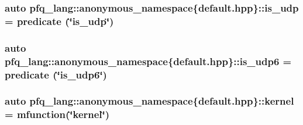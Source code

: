 \hypertarget{namespacepfq__lang_1_1anonymous__namespace_02default_8hpp_03_a120b37089690955fc25203beb98f0fe7}{
\subsubsection[{is\+\_\+udp}]{\setlength{\rightskip}{0pt plus 5cm}auto pfq\+\_\+lang\+::anonymous\+\_\+namespace\{default.\+hpp\}\+::is\+\_\+udp = {\bf predicate} (\char`\"{}is\+\_\+udp\char`\"{})}}\label{namespacepfq__lang_1_1anonymous__namespace_02default_8hpp_03_a120b37089690955fc25203beb98f0fe7}
\hypertarget{namespacepfq__lang_1_1anonymous__namespace_02default_8hpp_03_a31e93829d19f72f4aece81f57d7cef9c}{
\subsubsection[{is\+\_\+udp6}]{\setlength{\rightskip}{0pt plus 5cm}auto pfq\+\_\+lang\+::anonymous\+\_\+namespace\{default.\+hpp\}\+::is\+\_\+udp6 = {\bf predicate} (\char`\"{}is\+\_\+udp6\char`\"{})}}\label{namespacepfq__lang_1_1anonymous__namespace_02default_8hpp_03_a31e93829d19f72f4aece81f57d7cef9c}
\hypertarget{namespacepfq__lang_1_1anonymous__namespace_02default_8hpp_03_a68a2502f951a2b671a7d0496609f5d2a}{
\subsubsection[{kernel}]{\setlength{\rightskip}{0pt plus 5cm}auto pfq\+\_\+lang\+::anonymous\+\_\+namespace\{default.\+hpp\}\+::kernel = {\bf mfunction}(\char`\"{}kernel\char`\"{})}}\label{namespacepfq__lang_1_1anonymous__namespace_02default_8hpp_03_a68a2502f951a2b671a7d0496609f5d2a}
